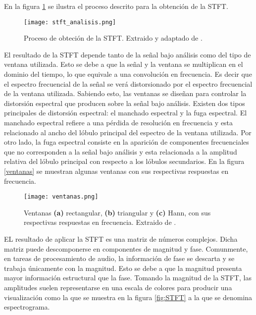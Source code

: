 En la figura \ref{fig:stft_analisis} se ilustra el proceso descrito para la obtención de la STFT.

\begin{figure}[H]
  \centering{}
  \texttt{[image: stft\_analisis.png]}
  \caption{Proceso de obteción de la STFT. Extraido y adaptado de \cite{matlab}.}
  \label{fig:stft_analisis}
\end{figure}

El resultado de la STFT depende tanto de la señal bajo análisis como del tipo de ventana utilizada. Esto se debe a que la señal y la ventana se multiplican en el dominio del tiempo, lo que equivale a una convolución en frecuencia. Es decir que el espectro frecuencial de la señal se verá distorsionado por el espectro frecuencial de la ventana utilizada. Sabiendo esto, las ventanas se diseñan para controlar la distorsión espectral que producen sobre la señal bajo análisis. Existen dos tipos principales de distorsión espectral: el manchado espectral y la fuga espectral. El manchado espectral refiere a una pérdida de resolución en frecuencia y esta relacionado al ancho del lóbulo principal del espectro de la ventana utilizada. Por otro lado, la fuga espectral consiste en la aparición de componentes frecuenciales que no corresponden a la señal bajo análisis y esta relacionada a la amplitud relativa del lóbulo principal con respecto a los lóbulos secundarios. En la figura \ref{ventanas} se muestran algunas ventanas con sus respectivas respuestas en frecuencia.

\begin{figure}[H]
  \centering{}
  \texttt{[image: ventanas.png]}
  \caption{Ventanas \textbf{(a)} rectangular, \textbf{(b)} triangular y \textbf{(c)} Hann, con sus respectivas respuestas en frecuencia. Extraido de \cite{valerio}.}
  \label{fig:ventanas}
\end{figure}

EL resultado de aplicar la STFT es una matriz de números complejos. Dicha matriz puede descomponerse en componentes de magnitud y fase. Comunmente, en tareas de procesamiento de audio, la información de fase se descarta y se trabaja únicamente con la magnitud. Esto se debe a que la magnitud presenta mayor información estructural que la fase. Tomando la magnitud de la STFT, las amplitudes suelen representarse en una escala de colores para producir una visualización como la que se muestra en la figura \ref{fig:STFT} a la que se denomina espectrograma.

